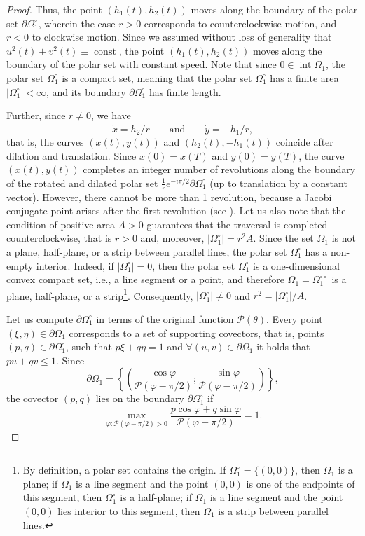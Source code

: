 \documentclass[a4paper,12pt]{article}
\DeclareMathOperator{\const}{const}
\newcommand {\PPP}{\mathcal{P}}
\theoremstyle{remark}
\theoremstyle{definition}
\begin{document}
\begin{proof}
	Thus, the point $(h_1(t),h_2(t))$ moves along the boundary of the polar set $\partial\Omega_1^{\circ}$, wherein the case $r>0$ corresponds to counterclockwise motion, and $r<0$ to clockwise motion. Since we assumed without loss of generality that $u^2(t)+v^2(t)\equiv\const$, the point $(h_1(t),h_2(t))$ moves along the boundary of the polar set with constant speed. Note that since $0\in\operatorname{int}\Omega_1$, the polar set $\Omega_1^\circ$ is a compact set, meaning that the polar set $\Omega_1^\circ$ has a finite area $|\Omega_1^\circ|<\infty$, and its boundary $\partial\Omega_1^\circ$ has finite length.
	
	Further, since $r\ne 0$, we have
	$$
	\dot{x} = \dot{h}_2 / r \qquad \text{and} \qquad \dot{y} = -\dot{h}_1 / r,
	$$
	that is, the curves $(x(t), y(t))$ and $(h_2(t), -h_1(t))$ coincide after dilation and translation.
	Since $x(0) = x(T)$ and $y(0) = y(T)$, the curve $(x(t), y(t))$ completes an integer number of revolutions along the boundary of the rotated and dilated polar set $\frac{1}{r} e^{-i\pi/2} \partial \Omega_1^\circ$ (up to translation by a constant vector). However, there cannot be more than 1 revolution, because a Jacobi conjugate point arises after the first revolution (see \cite{Lokut1}). Let us also note that the condition of positive area $A>0$ guarantees that the traversal is completed counterclockwise, that is $r>0$ and, moreover, $|\Omega_1^\circ|=r^2A$. Since the set $\Omega_1$ is not a plane, half-plane, or a strip between parallel lines, the polar set $\Omega_1^\circ$ has a non-empty interior. Indeed, if $|\Omega_1^\circ|=0$, then the polar set $\Omega_1^\circ$ is a one-dimensional convex compact set, i.e., a line segment or a point, and therefore $\Omega_1=\Omega_1^{\circ\circ}$ is a plane, half-plane, or a strip\footnote{By definition, a polar set contains the origin. If $\Omega_1^\circ=\{(0,0)\}$, then $\Omega_1$ is a plane; if $\Omega_1$ is a line segment and the point $(0,0)$ is one of the endpoints of this segment, then $\Omega_1^\circ$ is a half-plane; if $\Omega_1$ is a line segment and the point $(0,0)$ lies interior to this segment, then $\Omega_1$ is a strip between parallel lines.}. Consequently, $|\Omega_1^\circ|\ne 0$ and $r^2=|\Omega_1^\circ|/A$.
	
	Let us compute $\partial \Omega_1^\circ$ in terms of the original function $\PPP(\theta)$. Every point $(\xi, \eta) \in \partial \Omega_1$ corresponds to a set of supporting covectors, that is, points $(p, q) \in \partial \Omega_1^\circ$, such that $p\xi + q\eta = 1$ and $\forall (u, v) \in \partial \Omega_1$ it holds that $pu + qv \le 1$. Since
	$$ \partial \Omega_1 = \left\{ \left( \frac{\cos\varphi}{\PPP(\varphi-\pi/2)} ; \frac{\sin\varphi}{\PPP(\varphi-\pi/2)} \right) \right\}, $$
	the covector $(p, q)$ lies on the boundary $\partial \Omega_1^\circ$ if
	$$ \max_{\varphi : \PPP(\varphi-\pi/2) > 0} \frac{p \cos\varphi + q \sin\varphi}{\PPP(\varphi-\pi/2)} = 1. $$
	

\end{proof}
\end{document}
